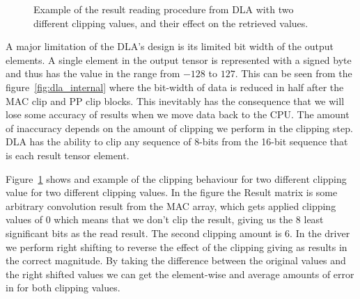 \documentclass[12pt,a4paper,english
]{tunithesis}
\begin{document}
\begin{figure}
  \caption{Example of the result reading procedure from DLA with two different clipping values, and their effect on the retrieved values.}
  \label{fig:clip-matrix}
\end{figure}


\label{sec:result-width-problem}
A major limitation of the DLA's design is its limited bit width of the output elements. A single element in the output tensor is represented with a signed byte and thus has the value in the range from $-128$ to $127$. This can be seen from the figure~\ref{fig:dla_internal} where the bit-width of data is reduced in half after the MAC clip and PP clip blocks. This inevitably has the consequence that we will lose some accuracy of results when we move data back to the CPU. The amount of inaccuracy depends on the amount of clipping we perform in the clipping step. DLA has the ability to clip any sequence of 8-bits from the 16-bit sequence that is each result tensor element.

Figure~\ref{fig:clip-matrix} shows and example of the clipping behaviour for two different clipping value for two different clipping values. In the figure the Result matrix is some arbitrary convolution result from the MAC array, which gets applied clipping values of $0$ which means that we don't clip the result, giving us the 8 least significant bits as the read result. The second clipping amount is $6$. In the driver we perform right shifting to reverse the effect of the clipping giving as results in the correct magnitude. By taking the difference between the original values and the right shifted values we can get the element-wise and average amounts of error in for both clipping values.
\end{document}
